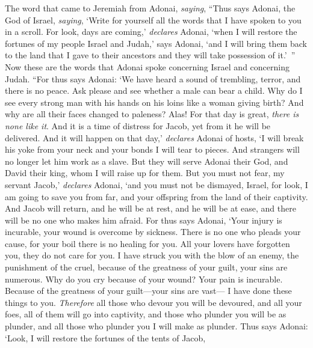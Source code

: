 \begin{biblechapter} %
 The word that came to Jeremiah from Adonai, \textit{saying},
\verse “Thus says Adonai, the God of Israel, \textit{saying}, ‘Write for yourself all the words that I have spoken to you in a scroll.
\verse For look, days are coming,’ \textit{declares} Adonai, ‘when I will restore the fortunes of my people Israel and Judah,’ says Adonai, ‘and I will bring them back to the land that I gave to their ancestors and they will take possession of it.’ ”
\verse Now these are the words that Adonai spoke concerning Israel and concerning Judah.
\verse “For thus says Adonai:
\verse ‘We have heard a sound of trembling, 
terror, and there is no peace.
\verse Ask please and see whether a male can bear a child. 
Why do I see every strong man 
with his hands on his loins like a woman giving birth? 
And why are all their faces changed to paleness?
\verse Alas! For that day is great, 
\textit{there is none like it}. 
And it is a time of distress for Jacob, 
yet from it he will be delivered.
\verse And it will happen on that day,’ \textit{declares} Adonai of hosts, 
‘I will break his yoke from your neck 
and your bonds I will tear to pieces. 
And strangers will no longer let him work as a slave.
\verse But they will serve Adonai their God, 
and David their king, whom I will raise up for them.
\verse But you must not fear, my servant Jacob,’ \textit{declares} Adonai, 
‘and you must not be dismayed, Israel, 
for look, I am going to save you from far, 
and your offspring from the land of their captivity. 
And Jacob will return, 
and he will be at rest, 
and he will be at ease, 
and there will be no one who makes him afraid.
\verse For thus says Adonai,
\verse ‘Your injury is incurable, 
your wound is overcome by sickness.
\verse There is no one who pleads your cause, 
for your boil there is no healing for you.
\verse All your lovers have forgotten you, 
they do not care for you. 
I have struck you with the blow of an enemy, 
the punishment of the cruel, 
because of the greatness of your guilt, 
your sins are numerous.
\verse Why do you cry because of your wound? 
Your pain is incurable. 
Because of the greatness of your guilt—your sins are vast— 
I have done these things to you.
\verse \textit{Therefore} all those who devour you will be devoured, 
and all your foes, all of them will go into captivity, 
and those who plunder you will be as plunder, 
and all those who plunder you I will make as plunder.
\verse Thus says Adonai:
\verse ‘Look, I will restore the fortunes of the tents of Jacob, 

\end{biblechapter}
